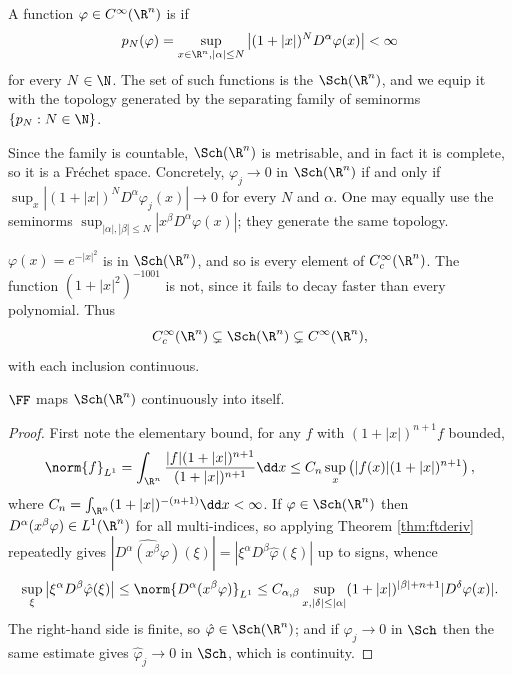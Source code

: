 \begin{definition}
	A function $\varphi \in C^\infty(\R^n)$ is  if
	$$p_N(\varphi) = \sup_{x \in \R^n, |\alpha|\le N}\left| (1+|x|)^N D^\alpha \varphi(x)\right| < \infty$$
	for every $N \in \N$. The set of such functions is the  $\Sch(\R^n)$, and we equip it with the topology generated by the separating family of seminorms $\{p_N : N \in \N\}$.
\end{definition}

Since the family is countable, $\Sch(\R^n)$ is metrisable, and in fact it is complete, so it is a Fr\'echet space. Concretely, $\varphi_j \to 0$ in $\Sch(\R^n)$ if and only if $\sup_x |(1+|x|)^N D^\alpha \varphi_j(x)|\to 0$ for every $N$ and $\alpha$. One may equally use the seminorms $\sup_{|\alpha|,|\beta|\le N}|x^\beta D^\alpha \varphi(x)|$; they generate the same topology.

\begin{example}
	$\varphi(x) = e^{-|x|^2}$ is in $\Sch(\R^n)$, and so is every element of $C_c^\infty(\R^n)$. The function $(1+|x|^2)^{-1001}$ is not, since it fails to decay faster than every polynomial. Thus
	$$C_c^\infty(\R^n)\subsetneq\Sch(\R^n)\subsetneq C^\infty(\R^n),$$
	with each inclusion continuous.
\end{example}

\begin{corollary}\label{cor:fschwartz}
	$\FF$ maps $\Sch(\R^n)$ continuously into itself.
\end{corollary}

\begin{proof}
	First note the elementary bound, for any $f$ with $(1+|x|)^{n+1}f$ bounded,
	$$\norm{f}_{L^1}=\int_{\R^n}\frac{|f|(1+|x|)^{n+1}}{(1+|x|)^{n+1}}\dd x \le C_n \sup_{x}\left( |f(x)|(1+|x|)^{n+1}\right),$$
	where $C_n = \int_{\R^n}(1+|x|)^{-(n+1)}\dd x<\infty$.
	If $\varphi \in \Sch(\R^n)$ then $D^\alpha(x^\beta\varphi) \in L^1(\R^n)$ for all multi-indices, so applying Theorem \ref{thm:ftderiv} repeatedly gives $\left|\widehat{D^\alpha(x^\beta \varphi)}(\xi)\right| = \left|\xi^\alpha D^\beta \hat\varphi(\xi)\right|$ up to signs, whence
	$$\sup_\xi \left| \xi^\alpha D^\beta \hat\varphi(\xi)\right| \le \norm{D^\alpha(x^\beta\varphi)}_{L^1}\le C_{\alpha,\beta}\sup_{x, |\delta|\le|\alpha|}(1+|x|)^{|\beta|+n+1}|D^\delta \varphi(x)|.$$
	The right-hand side is finite, so $\hat\varphi\in\Sch(\R^n)$; and if $\varphi_j \to 0$ in $\Sch$ then the same estimate gives $\hat\varphi_j\to 0$ in $\Sch$, which is continuity.
\end{proof}

